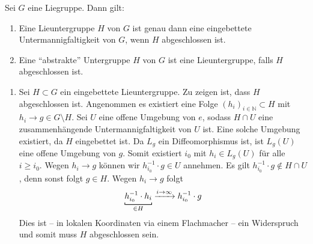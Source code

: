 \begin{satz}[label=satz:1210,{name=[Abgeschlossenheit von Lieuntergruppen]}]
	Sei $G$ eine Liegruppe. Dann gilt:
	\begin{enumerate}[1)]
		\item Eine Lieuntergruppe $H$ von $G$ ist genau dann eine eingebettete Untermannigfaltigkeit von $G$, wenn $H$ abgeschlossen ist.
		\item Eine \enquote{abstrakte} Untergruppe $H$ von $G$ ist eine Lieuntergruppe, falls $H$ abgeschlossen ist.
	\end{enumerate}
\end{satz}
\begin{beweis}
	\begin{enumerate}[1)]
		\item Sei $H \subset G$ ein eingebettete Lieuntergruppe. 
		Zu zeigen ist, dass $H$ abgeschlossen ist.
		Angenommen es existiert eine Folge $(h_i)_{i \in \mathbb{N}} \subset H$ mit $h_i \to g \in G \setminus H$.
		Sei $U$ eine offene Umgebung von $e$, sodass $H \cap U$ eine zusammenhängende Untermannigfaltigkeit von $U$ ist.
		Eine solche Umgebung existiert, da $H$ eingebettet ist.
		Da $L_g$ ein Diffeomorphismus ist, ist $L_g(U)$ eine offene Umgebung von $g$.
		Somit existiert $i_0$ mit $h_i \in L_g(U)$ für alle $i \ge i_0$.
		Wegen $h_i \to g$ können wir $h_{i_0}^{-1} \cdot g \in U$ annehmen.
		Es gilt $h_{i_0}^{-1} \cdot g \notin H \cap U$, denn sonst folgt $g \in H$.
		Wegen $h_i \to g$ folgt
		\[
			\Underbracket{h_{i_0}^{-1}\cdot h_i}{\in H}  \grenzw{i \to \infty} h_{i_0}^{-1} \cdot g
		\]
		Dies ist -- in lokalen Koordinaten via einem Flachmacher -- ein Widerspruch und somit muss $H$ abgeschlossen sein.
		

\end{enumerate}
\end{beweis}
